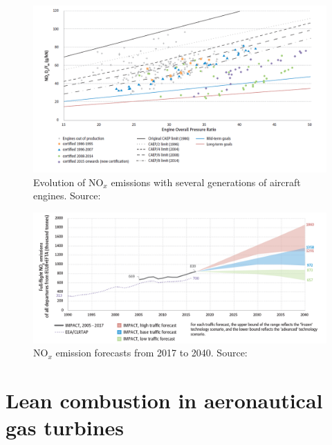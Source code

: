 \begin{figure}[h!]
	\centering
	\includegraphics[scale=0.6]{./part0_intro/NOx_emissions_with_OPR}
	\caption[Evolution of NO$_x$ emissions with several generations of aircraft engines]{Evolution of NO$_x$ emissions with several generations of aircraft engines. Source: }
	\label{fig:NOX_emissions_with_OPR}
\end{figure}

\begin{figure}[h!]
	\centering
	\includegraphics[scale=0.6]{./part0_intro/NOx_emissions_forecast_report2019}
	\caption[NO$_x$ emission forecasts from 2017 to 2040]{NO$_x$ emission forecasts from 2017 to 2040. Source: }
	\label{fig:NOX_forecasts}
\end{figure}


\section{Lean combustion in aeronautical gas turbines}


